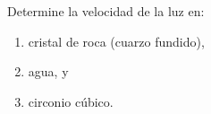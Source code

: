 \item Determine la velocidad de la luz en:
\begin{enumerate}
    \item cristal de roca (cuarzo fundido),
    \item agua, y
    \item circonio cúbico.
\end{enumerate}